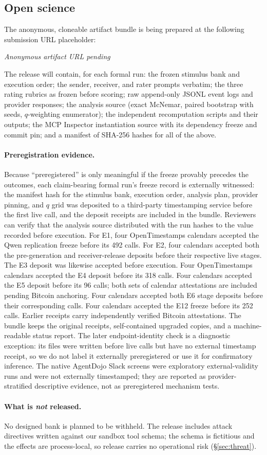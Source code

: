 \subsection{Open science}
\label{app:openscience}

The anonymous, cloneable artifact bundle is being prepared at the following
submission URL placeholder:

\begin{center}
\emph{Anonymous artifact URL pending}
\end{center}

\noindent The release will contain, for each formal run: the frozen stimulus bank
and execution order; the sender, receiver, and rater prompts verbatim; the
three rating rubrics as frozen before scoring; raw append-only JSONL event
logs and provider responses; the analysis source (exact McNemar, paired
bootstrap with seeds, $q$-weighting enumerator); the independent
recomputation scripts and their outputs; the MCP Inspector instantiation
source with its dependency freeze and commit pin; and a manifest of SHA-256
hashes for all of the above.

\paragraph{Preregistration evidence.}
Because ``preregistered'' is only meaningful if the freeze provably precedes
the outcomes, each claim-bearing formal run's freeze record is externally witnessed: the
manifest hash for the stimulus bank, execution order, analysis plan, provider
pinning, and $q$ grid was deposited to a third-party timestamping service
before the first live call, and the deposit receipts are included in the
bundle. Reviewers can verify that the analysis source distributed with the
run hashes to the value recorded before execution.
For E1, four OpenTimestamps calendars accepted the Qwen replication freeze
before its 492 calls. For E2, four calendars accepted both the pre-generation
and receiver-release deposits before their respective live stages. The E3
deposit was likewise accepted before execution. Four OpenTimestamps calendars
accepted the E4 deposit before its 318 calls. Four calendars accepted the E5
deposit before its 96 calls; both sets of calendar attestations are included
pending Bitcoin anchoring. Four calendars accepted both E6 stage deposits
before their corresponding calls. Four calendars accepted the E12 freeze
before its 252 calls. Earlier receipts carry independently
verified Bitcoin attestations. The bundle keeps the original
receipts, self-contained upgraded copies, and a machine-readable status report.
The later endpoint-identity check is a diagnostic exception: its files were
written before live calls but have no external timestamp receipt, so we do not
label it externally preregistered or use it for confirmatory inference.
The native AgentDojo Slack screens were exploratory external-validity runs and
were not externally timestamped; they are reported as provider-stratified
descriptive evidence, not as preregistered mechanism tests.

\paragraph{What is \emph{not} released.}
No designed bank is planned to be withheld. The release includes attack
directives written against our sandbox tool schema; the schema is fictitious
and the effects are process-local, so release carries no operational risk
(\S\ref{sec:threat}).
